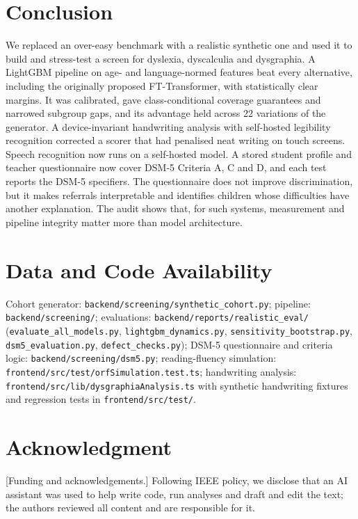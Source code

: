 \documentclass[conference]{IEEEtran}
\begin{document}
\section{Conclusion}
We replaced an over-easy benchmark with a realistic synthetic one and used it to
build and stress-test a screen for dyslexia, dyscalculia and dysgraphia. A LightGBM
pipeline on age- and language-normed features beat every alternative, including the
originally proposed FT-Transformer, with statistically clear margins. It was
calibrated, gave class-conditional coverage guarantees and narrowed subgroup gaps, and
its advantage held across 22 variations of the generator. A device-invariant
handwriting analysis with self-hosted legibility recognition corrected a scorer that
had penalised neat writing on touch screens. Speech recognition now runs on a
self-hosted model. A stored student profile and teacher questionnaire now cover DSM-5
Criteria A, C and D, and each test reports the DSM-5 specifiers. The questionnaire
does not improve discrimination, but it makes referrals interpretable and identifies
children whose difficulties have another explanation. The audit shows that, for such
systems, measurement and pipeline integrity matter more than model architecture.

\section*{Data and Code Availability}
Cohort generator: \texttt{backend/screening/synthetic\_cohort.py}; pipeline:
\texttt{backend/screening/}; evaluations: \texttt{backend/reports/realistic\_eval/}
(\texttt{evaluate\_all\_models.py}, \texttt{lightgbm\_dynamics.py},
\texttt{sensitivity\_bootstrap.py}, \texttt{dsm5\_evaluation.py},
\texttt{defect\_checks.py}); DSM-5 questionnaire and criteria logic:
\texttt{backend/screening/dsm5.py}; reading-fluency simulation:
\texttt{frontend/src/test/orfSimulation.test.ts}; handwriting analysis:
\texttt{frontend/src/lib/dysgraphiaAnalysis.ts} with synthetic handwriting fixtures
and regression tests in \texttt{frontend/src/test/}.

\section*{Acknowledgment}
[Funding and acknowledgements.] Following IEEE policy, we disclose that an AI
assistant was used to help write code, run analyses and draft and edit the text; the
authors reviewed all content and are responsible for it.
\end{document}
